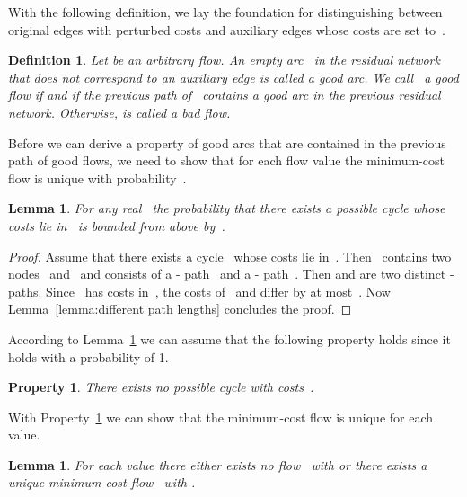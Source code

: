 \documentclass[11pt]{article}
\newtheorem{lemma}[theorem]{Lemma}
\newtheorem{definition}[theorem]{Definition}
\newtheorem{property}[theorem]{Property}
\begin{document}
With the following definition, we lay the foundation for distinguishing between original edges with perturbed costs and auxiliary edges whose costs are set to~.

\begin{definition}
Let  be an arbitrary flow. An empty arc~ in the residual network~ that does not correspond to an auxiliary edge is called a \emph{good arc}. We call~ a \emph{good flow} if  and if the previous path of~ contains a good arc in the previous residual network. Otherwise,  is called a \emph{bad flow}.
\end{definition}

Before we can derive a property of good arcs that are contained in the previous path of good flows, we need to show that for each flow value the minimum-cost flow is unique with probability~.

\begin{lemma}
\label{lemma:non zero cycle lengths}
For any real~ the probability that there exists a possible cycle whose costs lie in~ is bounded from above by~.
\end{lemma}

\begin{proof}
Assume that there exists a cycle~ whose costs lie in~. Then~ contains two nodes~ and~ and consists of a - path~ and a - path~.
Then  and  are two distinct - paths. Since~ has costs in~, the costs of~ and  differ by at most~.
Now Lemma~\ref{lemma:different path lengths} concludes the proof.
\end{proof}

According to Lemma~\ref{lemma:non zero cycle lengths} we can assume that the following property holds since it holds with a probability of 1.

\begin{property}
\label{property:non zero cycle lengths}
There exists no possible cycle with costs~.
\end{property}

With Property~\ref{property:non zero cycle lengths} we can show that the minimum-cost flow is unique for each value.

\begin{lemma}
\label{lemma:unique minimum cost flow}
For each value  there either exists no flow~ with  or there exists a unique minimum-cost flow~ with .
\end{lemma}
\end{document}
